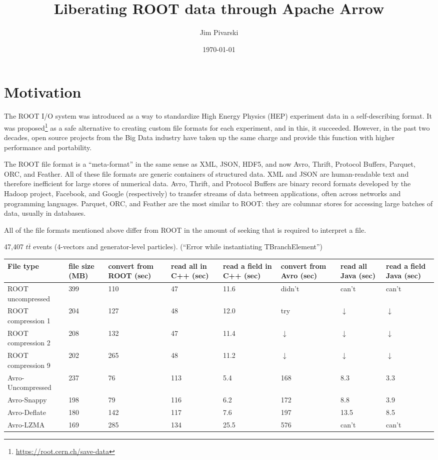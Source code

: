 \documentclass{article}
\title{Liberating ROOT data through Apache Arrow}
\author{Jim Pivarski}
\date{\today}
\begin{document}
\maketitle

\section*{Motivation}

The ROOT I/O system was introduced as a way to standardize High Energy Physics (HEP) experiment data in a self-describing format. It was proposed\footnote{\url{https://root.cern.ch/save-data}} as a safe alternative to creating custom file formats for each experiment, and in this, it succeeded. However, in the past two decades, open source projects from the Big Data industry have taken up the same charge and provide this function with higher performance and portability. 

The ROOT file format is a ``meta-format'' in the same sense as XML, JSON, HDF5, and now Avro, Thrift, Protocol Buffers, Parquet, ORC, and Feather. All of these file formats are generic containers of structured data. XML and JSON are human-readable text and therefore inefficient for large stores of numerical data. Avro, Thrift, and Protocol Buffers are binary record formats developed by the Hadoop project, Facebook, and Google (respectively) to transfer streams of data between applications, often across networks and programming languages. Parquet, ORC, and Feather are the most similar to ROOT: they are columnar stores for accessing large batches of data, usually in databases.

All of the file formats mentioned above differ from ROOT in the amount of seeking that is required to interpret a file. 




47,407 $t\bar{t}$ events (4-vectors and generator-level particles). (``Error while instantiating TBranchElement'')

\begin{tabular}{p{3.5 cm} | P{1 cm} P{1 cm} P{1 cm} P{1.1 cm} P{1 cm} P{1 cm} P{1 cm}}
File type & file size (MB) & convert from ROOT (sec) & read all in C++ (sec) & read a field in C++ (sec) & convert from Avro (sec) & read all Java (sec) & read a field Java (sec)      \\\hline
ROOT uncompressed  & 399 & 110 &  47 & 11.6 & didn't & can't & can't \\
ROOT compression 1 & 204 & 127 &  48 & 12.0 & try & $\downarrow$ & $\downarrow$ \\
ROOT compression 2 & 208 & 132 &  47 & 11.4 & $\downarrow$ & $\downarrow$ & $\downarrow$ \\
ROOT compression 9 & 202 & 265 &  48 & 11.2 & $\downarrow$ & $\downarrow$ & $\downarrow$ \\\hline
Avro-Uncompressed  & 237 &  76 & 113 &  5.4 & 168 &  8.3  & 3.3   \\
Avro-Snappy        & 198 &  79 & 116 &  6.2 & 172 &  8.8  & 3.9   \\
Avro-Deflate       & 180 & 142 & 117 &  7.6 & 197 & 13.5  & 8.5   \\
Avro-LZMA          & 169 & 285 & 134 & 25.5 & 576 & can't & can't \\
\end{tabular}
\end{document}
